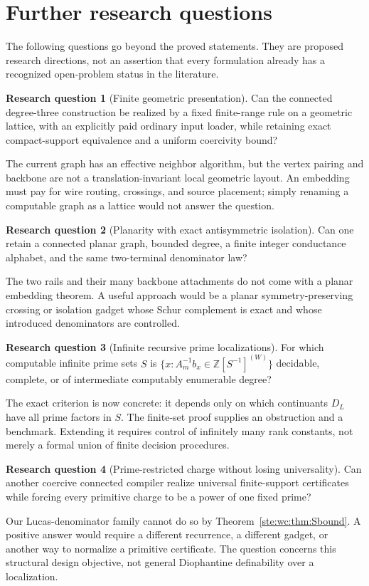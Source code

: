 \documentclass[11pt,letterpaper]{article}
\theoremstyle{definition}
\newtheorem{question}{Research question}
\theoremstyle{remark}
\newcommand{\Z}{\mathbb Z}
\begin{document}
\section{Further research questions}
\label{ste:wc:sec:questions}

The following questions go beyond the proved statements. They are proposed
research directions, not an assertion that every formulation already has
a recognized open-problem status in the literature.

\begin{question}[Finite geometric presentation]\label{ste:wc:q:geometric}
Can the connected degree-three construction be realized by a fixed
finite-range rule on a geometric lattice, with an explicitly paid ordinary
input loader, while retaining exact compact-support equivalence and a
uniform coercivity bound?
\end{question}
The current graph has an effective neighbor algorithm, but the vertex
pairing and backbone are not a translation-invariant local geometric
layout. An embedding must pay for wire routing, crossings, and source
placement; simply renaming a computable graph as a lattice would not answer
the question.

\begin{question}[Planarity with exact antisymmetric isolation]\label{ste:wc:q:planar}
Can one retain a connected planar graph, bounded degree, a finite integer
conductance alphabet, and the same two-terminal denominator law?
\end{question}
The two rails and their many backbone attachments do not come with a planar
embedding theorem. A useful approach would be a planar symmetry-preserving
crossing or isolation gadget whose Schur complement is exact and whose
introduced denominators are controlled.

\begin{question}[Infinite recursive prime localizations]\label{ste:wc:q:infinite}
For which computable infinite prime sets $S$ is
$\{x:A_m^{-1}b_x\in\Z[S^{-1}]^{(W)}\}$ decidable, complete, or of intermediate
computably enumerable degree?
\end{question}
The exact criterion is now concrete: it depends only on which continuants
$D_L$ have all prime factors in $S$. The finite-set proof supplies an
obstruction and a benchmark. Extending it requires control of infinitely
many rank constants, not merely a formal union of finite decision procedures.

\begin{question}[Prime-restricted charge without losing universality]\label{ste:wc:q:primecharge}
Can another coercive connected compiler realize universal finite-support
certificates while forcing every primitive charge to be a power of one
fixed prime?
\end{question}
Our Lucas-denominator family cannot do so by Theorem~\ref{ste:wc:thm:Sbound}. A positive
answer would require a different recurrence, a different gadget, or another
way to normalize a primitive certificate. The question concerns this
structural design objective, not general Diophantine definability over a
localization.
\end{document}
